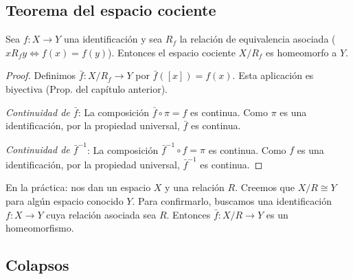 
\subsection{Teorema del espacio cociente}

\begin{teorema}
    Sea $f: X \to Y$ una identificación y sea $R_f$ la relación de equivalencia asociada ($xR_fy \iff f(x) = f(y)$). Entonces el espacio cociente $X/R_f$ es homeomorfo a $Y$.
\end{teorema}
\begin{proof}
    Definimos $\bar{f}: X/R_f \to Y$ por $\bar{f}([x]) = f(x)$. Esta aplicación es biyectiva (Prop. del capítulo anterior).

    \textit{Continuidad de $\bar{f}$}: La composición $\bar{f} \circ \pi = f$ es continua. Como $\pi$ es una identificación, por la propiedad universal, $\bar{f}$ es continua.

    \textit{Continuidad de $\bar{f}^{-1}$}: La composición $\bar{f}^{-1} \circ f = \pi$ es continua. Como $f$ es una identificación, por la propiedad universal, $\bar{f}^{-1}$ es continua.
\end{proof}

\begin{observación}
    En la práctica: nos dan un espacio $X$ y una relación $R$. Creemos que $X/R \cong Y$ para algún espacio conocido $Y$. Para confirmarlo, buscamos una identificación $f: X \to Y$ cuya relación asociada sea $R$. Entonces $\bar{f}: X/R \to Y$ es un homeomorfismo.
\end{observación}




\subsection{Colapsos}

